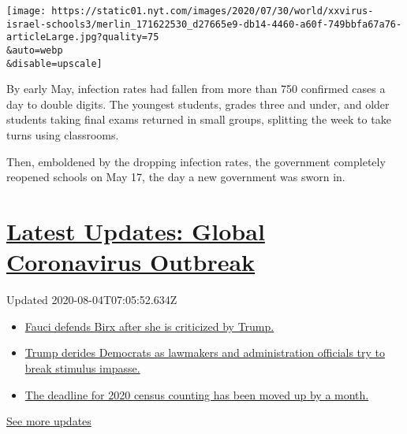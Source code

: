 \texttt{[image: https://static01.nyt.com/images/2020/07/30/world/xxvirus-israel-schools3/merlin\_171622530\_d27665e9-db14-4460-a60f-749bbfa67a76-articleLarge.jpg?quality=75\\\&auto=webp\\\&disable=upscale]}

By early May, infection rates had fallen from more than 750 confirmed
cases a day to double digits. The youngest students, grades three and
under, and older students taking final exams returned in small groups,
splitting the week to take turns using classrooms.

Then, emboldened by the dropping infection rates, the government
completely reopened schools on May 17, the day a new government was
sworn in.

\hypertarget{latest-updates-global-coronavirus-outbreak}{%
\section{\texorpdfstring{\href{https://www.nytimes.com/2020/08/03/world/coronavirus-covid-19.html?action=click\&pgtype=Article\&state=default\&region=MAIN_CONTENT_1\&context=storylines_live_updates}{Latest
Updates: Global Coronavirus
Outbreak}}{Latest Updates: Global Coronavirus Outbreak}}\label{latest-updates-global-coronavirus-outbreak}}

Updated 2020-08-04T07:05:52.634Z

\begin{itemize}
\tightlist
\item
  \href{https://www.nytimes.com/2020/08/03/world/coronavirus-covid-19.html?action=click\&pgtype=Article\&state=default\&region=MAIN_CONTENT_1\&context=storylines_live_updates\#link-4547638f}{Fauci
  defends Birx after she is criticized by Trump.}
\item
  \href{https://www.nytimes.com/2020/08/03/world/coronavirus-covid-19.html?action=click\&pgtype=Article\&state=default\&region=MAIN_CONTENT_1\&context=storylines_live_updates\#link-15e7f995}{Trump
  derides Democrats as lawmakers and administration officials try to
  break stimulus impasse.}
\item
  \href{https://www.nytimes.com/2020/08/03/world/coronavirus-covid-19.html?action=click\&pgtype=Article\&state=default\&region=MAIN_CONTENT_1\&context=storylines_live_updates\#link-e5a2cda}{The
  deadline for 2020 census counting has been moved up by a month.}
\end{itemize}

\href{https://www.nytimes.com/2020/08/03/world/coronavirus-covid-19.html?action=click\&pgtype=Article\&state=default\&region=MAIN_CONTENT_1\&context=storylines_live_updates}{See
more updates}

